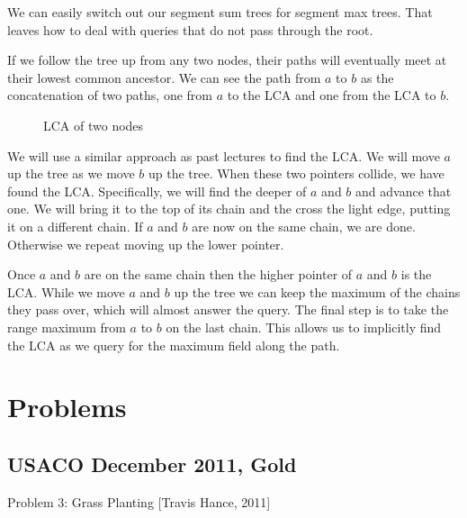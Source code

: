 \documentclass{article}
\begin{document}
We can easily switch out our segment sum trees for segment max trees. That leaves how to deal with queries that do not pass through the root.

If we follow the tree up from any two nodes, their paths will eventually meet at their lowest common ancestor.  We can see the path from $a$ to $b$ as the concatenation of two paths, one from $a$ to the LCA and one from the LCA to $b$.

\begin{figure}[h]
\center
{}
\caption{LCA of two nodes}
\end{figure}

We will use a similar approach as past lectures to find the LCA.  We will move $a$ up the tree as we move $b$ up the tree.  When these two pointers collide, we have found the LCA.  Specifically, we will find the deeper of $a$ and $b$ and advance that one.  We will bring it to the top of its chain and the cross the light edge, putting it on a different chain.  If $a$ and $b$ are now on the same chain, we are done.  Otherwise we repeat moving up the lower pointer.

Once $a$ and $b$ are on the same chain then the higher pointer of $a$ and $b$ is the LCA.  While we move $a$ and $b$ up the tree we can keep the maximum of the chains they pass over, which will almost answer the query.  The final step is to take the range maximum from $a$ to $b$ on the last chain.  This allows us to implicitly find the LCA as we query for the maximum field along the path.

\section{Problems}

\subsection{USACO December 2011, Gold}

Problem 3: Grass Planting [Travis Hance, 2011]
\end{document}
